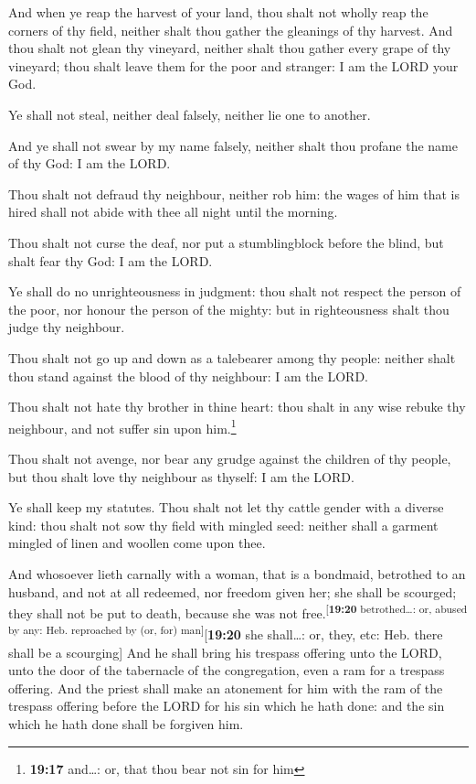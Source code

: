  And when ye reap the harvest of your land, thou shalt not
wholly reap the corners of thy field, neither shalt thou gather the
gleanings of thy harvest.  And thou shalt not glean thy
vineyard, neither shalt thou gather every grape of thy vineyard; thou
shalt leave them for the poor and stranger: I am the LORD your God.

 Ye shall not steal, neither deal falsely, neither lie
one to another.

 And ye shall not swear by my name falsely, neither shalt
thou profane the name of thy God: I am the LORD.

 Thou shalt not defraud thy neighbour, neither rob him:
the wages of him that is hired shall not abide with thee all night until
the morning.

 Thou shalt not curse the deaf, nor put a stumblingblock
before the blind, but shalt fear thy God: I am the LORD.

 Ye shall do no unrighteousness in judgment: thou shalt
not respect the person of the poor, nor honour the person of the mighty:
but in righteousness shalt thou judge thy neighbour.

 Thou shalt not go up and down as a talebearer among thy
people: neither shalt thou stand against the blood of thy neighbour: I
am the LORD.

 Thou shalt not hate thy brother in thine heart: thou
shalt in any wise rebuke thy neighbour, and not suffer sin upon
him.\footnote{\textbf{19:17} and\ldots: or, that thou bear not sin for
  him}

 Thou shalt not avenge, nor bear any grudge against the
children of thy people, but thou shalt love thy neighbour as thyself: I
am the LORD.

 Ye shall keep my statutes. Thou shalt not let thy cattle
gender with a diverse kind: thou shalt not sow thy field with mingled
seed: neither shall a garment mingled of linen and woollen come upon
thee.

 And whosoever lieth carnally with a woman, that is a
bondmaid, betrothed to an husband, and not at all redeemed, nor freedom
given her; she shall be scourged; they shall not be put to death,
because she was not free.\textsuperscript{{[}\textbf{19:20}
betrothed\ldots: or, abused by any: Heb. reproached by (or, for)
man{]}}{[}\textbf{19:20} she shall\ldots: or, they, etc: Heb. there
shall be a scourging{]}  And he shall bring his trespass
offering unto the LORD, unto the door of the tabernacle of the
congregation, even a ram for a trespass offering.  And
the priest shall make an atonement for him with the ram of the trespass
offering before the LORD for his sin which he hath done: and the sin
which he hath done shall be forgiven him.

